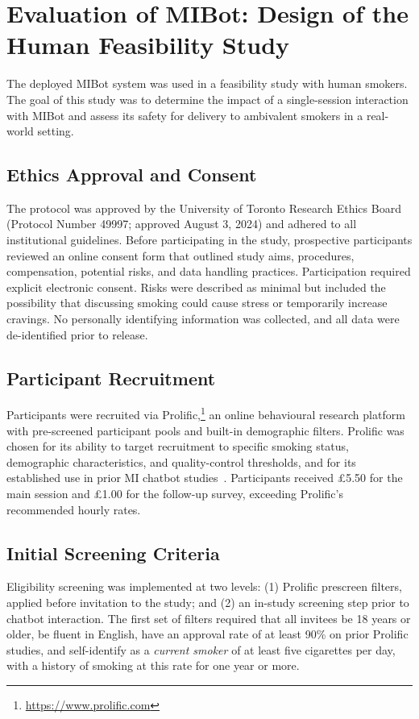 \chapter{Evaluation of MIBot: Design of the Human Feasibility Study}
\label{ch:feasibility}
The deployed MIBot system was used in a feasibility study with human smokers. The goal of this study was to determine the impact of a single-session interaction with MIBot and assess its safety for delivery to ambivalent smokers in a real-world setting.

\section{Ethics Approval and Consent}
The protocol was approved by the University of Toronto Research Ethics Board (Protocol Number 49997; approved August 3, 2024) and adhered to all institutional guidelines. Before participating in the study, prospective participants reviewed an online consent form that outlined study aims, procedures, compensation, potential risks, and data handling practices. Participation required explicit electronic consent. Risks were described as minimal but included the possibility that discussing smoking could cause stress or temporarily increase cravings. No personally identifying information was collected, and all data were de-identified prior to release.

\section{Participant Recruitment}
\label{sec:recruitment}
Participants were recruited via Prolific,\footnote{\url{https://www.prolific.com}} an online behavioural research platform with pre-screened participant pools and built-in demographic filters. Prolific was chosen for its ability to target recruitment to specific smoking status, demographic characteristics, and quality-control thresholds, and for its established use in prior MI chatbot studies~\citep{brown2023motivational,info:doi/10.2196/20251}. Participants received \pounds5.50 for the main session and \pounds1.00 for the follow-up survey, exceeding Prolific's recommended hourly rates.


\section{Initial Screening Criteria}
Eligibility screening was implemented at two levels: (1) Prolific prescreen filters, applied before invitation to the study; and (2) an in-study screening step prior to chatbot interaction. The first set of filters required that all invitees be 18 years or older, be fluent in English, have an approval rate of at least 90\% on prior Prolific studies, and self-identify as a \emph{current smoker} of at least five cigarettes per day, with a history of smoking at this rate for one year or more.


